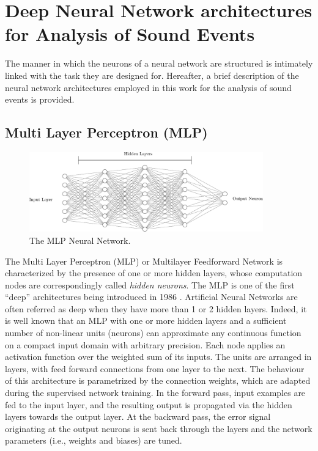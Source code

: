 \section{Deep Neural Network architectures for Analysis of Sound Events}

The manner in which the neurons of a neural network are structured is intimately linked with the task they are designed for. Hereafter, a brief description of the neural network architectures employed in this work for the analysis of sound events is provided.


\subsection{Multi Layer Perceptron (MLP)}

\begin{figure}[h]
	\centering
	\includegraphics[width=0.9\textwidth]{img/mlp}
	\caption{The MLP Neural Network.}
	\label{fig:ANN}
\end{figure}

The Multi Layer Perceptron (MLP) or Multilayer Feedforward Network is characterized by the presence of one or more hidden layers, whose computation nodes are correspondingly called \textit{hidden neurons}.
The MLP is one of the first ``deep'' architectures being introduced in 1986 \cite{Rumelhart86-LRB}. Artificial Neural Networks are often referred as deep when they have more than 1 or 2 hidden layers.
Indeed, it is well known that an  MLP with one or more hidden layers and a sufficient number of non-linear units (neurons) can  approximate any continuous  function  on  a  compact  input  domain  with arbitrary precision.
Each node applies an activation function over the weighted sum of its inputs. 
The units are arranged in layers, with feed forward connections from one layer to the next. 
The behaviour of this architecture  is  parametrized  by  the connection weights, which are adapted during the supervised network training.
In the forward pass, input examples are fed to the input layer, and the resulting output is propagated via the hidden layers towards the output layer. At the backward pass, the error signal originating at the output neurons is sent back through the layers and the network parameters (i.e., weights and biases) are tuned.

